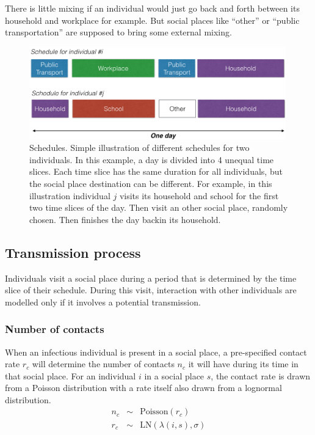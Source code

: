 \documentclass[11pt, onecolumn]{article}
\begin{document}
There is little mixing if an individual would just go back and forth between its household and workplace for example. But social places like ``other'' or ``public transportation'' are supposed to bring some external mixing.


\begin{figure}[!ht]
\centering
    \includegraphics[angle=0,width=0.99\textwidth]{figures/schedule.png}
\caption{Schedules. Simple illustration of different schedules for two individuals. In this example, a day is divided into 4 unequal time slices. Each time slice has the same duration for all individuals, but the social place destination can be different. For example, in this illustration individual $j$ visits its household and school for the first two time slices of the day. Then visit an other social place, randomly chosen. Then finishes the day backin its household.}
\label{fig:SP_indiv}
\end{figure}


\subsection{Transmission process}

Individuals visit a social place during a period that is determined by the time slice of their schedule. During this visit, interaction with other individuals are modelled only if it involves a potential transmission. 

\subsubsection*{Number of contacts}

When an infectious individual is present in a social place, a pre-specified contact rate $r_c$ will determine the number of contacts $n_c$ it will have during its time in that social place. For an individual $i$ in a social place $s$, the contact rate is drawn from a Poisson distribution with a rate itself also drawn from a lognormal distribution. 
\begin{eqnarray}
n_c & \sim & \text{Poisson}(r_c)\\
r_c & \sim & \text{LN}(\lambda(i,s), \sigma)
\end{eqnarray}
\end{document}
